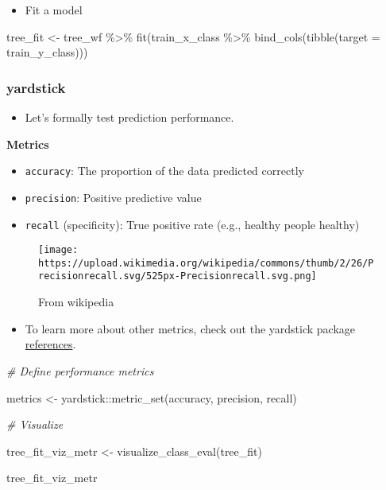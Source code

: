 \documentclass[
]{book}
\newenvironment{Shaded}{\begin{snugshade}}{\end{snugshade}}
\newcommand{\AttributeTok}[1]{\textcolor[rgb]{0.77,0.63,0.00}{#1}}
\newcommand{\CommentTok}[1]{\textcolor[rgb]{0.56,0.35,0.01}{\textit{#1}}}
\newcommand{\FunctionTok}[1]{\textcolor[rgb]{0.00,0.00,0.00}{#1}}
\newcommand{\NormalTok}[1]{#1}
\newcommand{\OtherTok}[1]{\textcolor[rgb]{0.56,0.35,0.01}{#1}}
\newcommand{\SpecialCharTok}[1]{\textcolor[rgb]{0.00,0.00,0.00}{#1}}
\providecommand{\tightlist}{%
  \setlength{\itemsep}{0pt}\setlength{\parskip}{0pt}}
\begin{document}
\begin{itemize}
\tightlist
\item
  Fit a model
\end{itemize}

\begin{Shaded}
\begin{Highlighting}[]
\NormalTok{tree\_fit }\OtherTok{\textless{}{-}}\NormalTok{ tree\_wf }\SpecialCharTok{\%\textgreater{}\%} \FunctionTok{fit}\NormalTok{(train\_x\_class }\SpecialCharTok{\%\textgreater{}\%} \FunctionTok{bind\_cols}\NormalTok{(}\FunctionTok{tibble}\NormalTok{(}\AttributeTok{target =}\NormalTok{ train\_y\_class)))}
\end{Highlighting}
\end{Shaded}

\hypertarget{yardstick-1}{%
\subsubsection{yardstick}\label{yardstick-1}}

\begin{itemize}
\tightlist
\item
  Let's formally test prediction performance.
\end{itemize}

\textbf{Metrics}

\begin{itemize}
\item
  \texttt{accuracy}: The proportion of the data predicted correctly
\item
  \texttt{precision}: Positive predictive value
\item
  \texttt{recall} (specificity): True positive rate (e.g., healthy people healthy)
\end{itemize}

\begin{figure}
\centering
\texttt{[image: https://upload.wikimedia.org/wikipedia/commons/thumb/2/26/Precisionrecall.svg/525px-Precisionrecall.svg.png]}
\caption{From wikipedia}
\end{figure}

\begin{itemize}
\tightlist
\item
  To learn more about other metrics, check out the yardstick package \href{https://yardstick.tidymodels.org/reference/index.html}{references}.
\end{itemize}

\begin{Shaded}
\begin{Highlighting}[]
\CommentTok{\# Define performance metrics }

\NormalTok{metrics }\OtherTok{\textless{}{-}}\NormalTok{ yardstick}\SpecialCharTok{::}\FunctionTok{metric\_set}\NormalTok{(accuracy, precision, recall)}

\CommentTok{\# Visualize}

\NormalTok{tree\_fit\_viz\_metr }\OtherTok{\textless{}{-}} \FunctionTok{visualize\_class\_eval}\NormalTok{(tree\_fit)}

\NormalTok{tree\_fit\_viz\_metr}
\end{Highlighting}
\end{Shaded}
\end{document}

